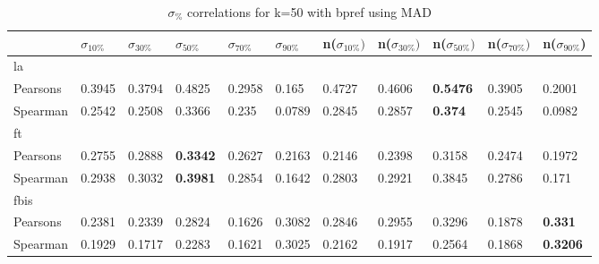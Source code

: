 \documentclass{sig-alternate}
\begin{document}
\begin{table}[h!]
\centering
\begin{tabular}{|l||l|l|l|l|l||l|l|l|l|l|}
\hline
& $\sigma_{10\%}$ & $\sigma_{30\%}$ & $\sigma_{50\%}$ & $\sigma_{70\%}$ & $\sigma_{90\%}$ & n($\sigma_{10\%})$ & n($\sigma_{30\%})$ & n($\sigma_{50\%})$ & n($\sigma_{70\%})$ & n($\sigma_{90\%}$) \\ \hline
\hline la &  &  &  &  &  &  &  &  &  &  \\ \hline
Pearsons & 0.3945 & 0.3794 & 0.4825 & 0.2958 & 0.165 & 0.4727 & 0.4606 & \textbf{0.5476} & 0.3905 & 0.2001 \\ \hline
Spearman & 0.2542 & 0.2508 & 0.3366 & 0.235 & 0.0789 & 0.2845 & 0.2857 & \textbf{0.374} & 0.2545 & 0.0982 \\ \hline
\hline ft &  &  &  &  &  &  &  &  &  &  \\ \hline
Pearsons & 0.2755 & 0.2888 & \textbf{0.3342} & 0.2627 & 0.2163 & 0.2146 & 0.2398 & 0.3158 & 0.2474 & 0.1972 \\ \hline
Spearman & 0.2938 & 0.3032 & \textbf{0.3981} & 0.2854 & 0.1642 & 0.2803 & 0.2921 & 0.3845 & 0.2786 & 0.171 \\ \hline
\hline fbis &  &  &  &  &  &  &  &  &  &  \\ \hline
Pearsons & 0.2381 & 0.2339 & 0.2824 & 0.1626 & 0.3082 & 0.2846 & 0.2955 & 0.3296 & 0.1878 & \textbf{0.331} \\ \hline
Spearman & 0.1929 & 0.1717 & 0.2283 & 0.1621 & 0.3025 & 0.2162 & 0.1917 & 0.2564 & 0.1868 & \textbf{0.3206} \\ \hline
\end{tabular}
\caption{$\sigma_{\%}$ correlations for k=50 with bpref using MAD}
\end{table}
\end{document}
